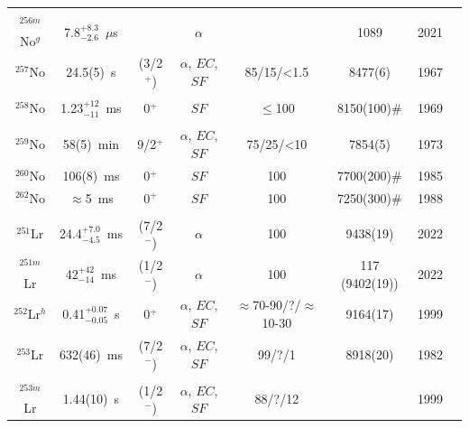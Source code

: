 \begin{center}
\begin{longtable}{c|ccccccl}
			&				&			&					&			&				    &		&{\tiny\cite{Kessaci2021}}\\
$^{256m}$No$^g$& 7.8$^{+8.3}_{-2.6}$~$\mu$s&&$\alpha$		&			& 1089			    &2021	&{\tiny\cite{Kessaci2021}}\\
$^{257}$No	& 24.5(5)~s		&  (3/2$^+$)&$\alpha$, $EC$, $SF$&85/15/<1.5& 8477(6)			&1967	&{\tiny\cite{Ghiorso1967,Flerov1968a,Eskola1970a,Holden2000,Lazarev2000,Morimoto2004}}\\
			&				&			&					&			& 				    &		&{\tiny\cite{Hofmann2002a,Asai2005,Haba2011,Murakami2013}}\\
$^{258}$No	& 1.23$^{+12}_{-11}$~ms&  0$^+$& $SF$			&$\leq$100	& 8150(100)$\#$	    &1969	&{\tiny\cite{Nurmia1969,Hulet1986,Hulet1989,Lazarev1994a,Lane1996,Holden2000}}\\
			&				&			&					&			& 				    &		&{\tiny\cite{Peterson2009,Banerjee2020}}\\
$^{259}$No	& 58(5)~min		& 9/2$^+$	&$\alpha$, $EC$,  $SF$&75/25/<10& 7854(5)			&1973	&{\tiny\cite{Silva1973,Wild1982,Holden2000,Asai2008,Devaraja2019}}\\
$^{260}$No	& 106(8)~ms		&  0$^+$	& $SF$				&100		& 7700(200)$\#$	    &1985	&{\tiny\cite{Somerville1985,Schaedel1986,Karamyan1986,Devaraja2019,Banerjee2020}}\\
$^{262}$No	&$\approx$5~ms	&  0$^+$	& $SF$				&100		& 7250(300)$\#$	    &1988	&{\tiny\cite{Lougheed1988,Hulet1989,Holden2000}}\\
\hline\\
$^{251}$Lr	&24.4$^{+7.0}_{-4.5}$~ms& (7/2$^-$)&$\alpha$    &100		& 9438(19)		    &2022	&{\tiny\cite{HuangT2022,Pore2024a}}\\
$^{251m}$Lr	&42$^{+42}_{-14}$~ms& (1/2$^-$)	&$\alpha$		&100		& 117 (9402(19))	&2022	&{\tiny\cite{HuangT2022}}\\
$^{252}$Lr$^h$& 0.41$^{+0.07}_{-0.05}$~s&  0$^+$	&$\alpha$, $EC$, $SF$&$\approx$70-90/?/$\approx$10-30&9164(17)&1999&{\tiny\cite{Oganessian1976,Hessberger1999b,Hessberger2001,Nelson2008,Pore2024}}\\
$^{253}$Lr	& 632(46)~ms	&  (7/2$^-$)&$\alpha$, $EC$, $SF$& 99/?/1	& 8918(20)          &1982	&{\tiny\cite{Hessberger1982,Hessberger1985,Muenzenberg1989,Hessberger1999,Holden2000,Folden2006}}\\
			&				&			&					&			& 				    &		&{\tiny\cite{Ito2018}}\\
$^{253m}$Lr	& 1.44(10)~s	&  (1/2$^-$)&$\alpha$, $EC$, $SF$& 88/?/12	& 			        &1999	&{\tiny\cite{Hessberger1999b,Hessberger2001,Folden2006}}\\

\end{longtable}
\end{center}
